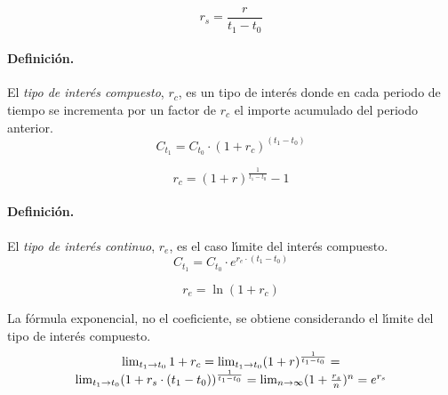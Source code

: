 \begin{equation}
\label{interes_simple_1}
r_s = \frac{r}{t_1 - t_0}
\end{equation}

\paragraph{Definici\'on.}
El \emph{tipo de inter\'es compuesto}, $r_c$, es un tipo
de inter\'es donde en cada periodo de tiempo se incrementa por un factor de $r_c$ el importe
acumulado del periodo anterior.
\begin{equation}
C_{t_1} = C_{t_0} \cdot (1+ r_c)^{(t_1-t_0)}
\end{equation}

\begin{equation}
\label{interes_compuesto_1}
r_c = (1 + r) ^ \frac{1}{t_1-t_0} - 1
\end{equation}

\paragraph{Definici\'on.}
El \emph{tipo de inter\'es continuo}, $r_e$, es el caso
l\'\i mite del inter\'es compuesto.
\begin{equation}
C_{t_1} = C_{t_0} \cdot e^{r_e \cdot (t_1-t_0)}
\end{equation}

\begin{equation}
\label{interes_continuo_1}
r_e = \ln(1 + r_c)
\end{equation}

La f\'ormula exponencial, no el coeficiente, se obtiene considerando el
l\'\i mite del tipo de inter\'es compuesto.
\begin{equation}
\label{interes_continuo_2}
\begin{array}{c}
\lim_{t_1 \rightarrow t_0} 1+r_c = 
\lim_{t_1 \rightarrow t_0} (1 + r)^{\frac{1}{t_1 - t_0}} = \cr
\lim_{t_1 \rightarrow t_0} (1 + r_s \cdot (t_1-t_0)) ^ {\frac{1}{t_1 - t_0}} =
\lim_{n \rightarrow \infty} (1 + \frac{r_s}{n}) ^ {n} = 
e^{r_s}
\end{array}
\end{equation}

